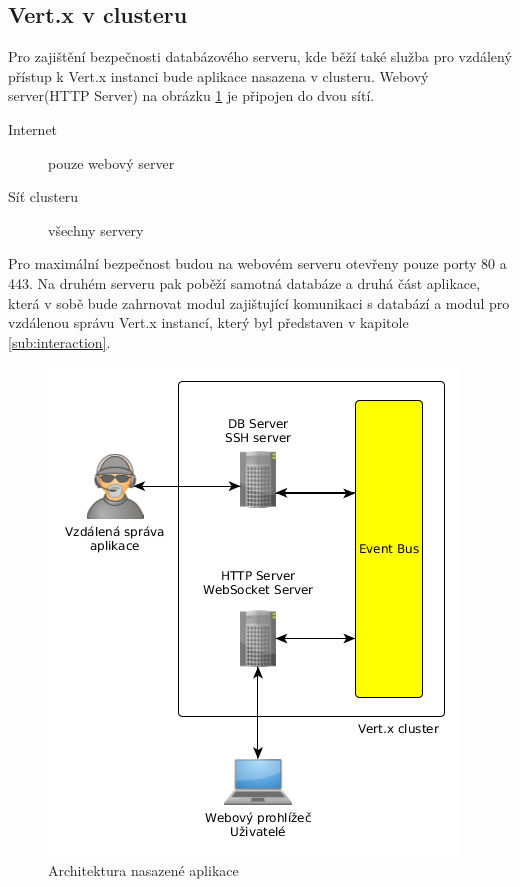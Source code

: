 \subsection{Vert.x v clusteru}\label{sub:praktCluster}

Pro zajištění bezpečnosti databázového serveru, kde běží také služba pro vzdálený přístup k Vert.x instanci bude aplikace nasazena v clusteru. Webový server(HTTP Server) na obrázku \ref{fig:architecture_real} je připojen do dvou sítí.

\begin{description}
\item[Internet] pouze webový server
\item[Síť clusteru] všechny servery
\end{description}

Pro maximální bezpečnost budou na webovém serveru otevřeny pouze porty 80 a 443. Na druhém serveru pak poběží samotná databáze a druhá část aplikace, která v sobě bude zahrnovat modul zajištující komunikaci s databází a modul pro vzdálenou správu Vert.x instancí, který byl představen v kapitole \ref{sub:interaction}.

\begin{figure}
\begin{centering}
\includegraphics[scale=0.5]{obrazky/architecture_real}
\par\end{centering}
\caption{Architektura nasazené aplikace\label{fig:architecture_real}}
\end{figure}

